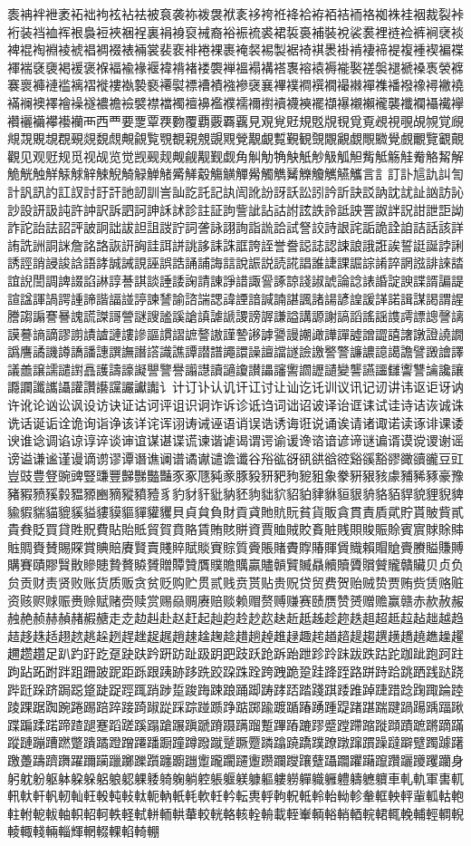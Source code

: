 袠袡袢袣袤袥袦袧袨袩袪被袬袭袮袯袰袱袲袳袴袵袶袷袸袹袺袻袼袽袾袿裀裁裂裃裄装裆裇裈裉裊裋裌裍裎裏裐裑裒裓裔裕裖裗裘裙裚裛補裝裞裟裠裡裢裣裤裥裦裧裨裩裪裫裬裭裮裯裰裱裲裳裴裵裶裷裸裹裺裻裼製裾裿褀褁褂褃褄褅褆複褈褉褊褋褌褍褎褏褐褑褒褓褔褕褖褗褘褙褚褛褜褝褞褟褠褡褢褣褤褥褦褧褨褩褪褫褬褭褮褯褰褱褲褳褴褵褶褷褸褹褺褻褼褽褾褿襀襁襂襃襄襅襆襇襈襉襊襋襌襍襎襏襐襑襒襓襔襕襖襗襘襙襚襛襜襝襞襟襠襡襢襣襤襥襦襧襨襩襪襫襬襭襮襯襰襱襲襳襴襵襶襷襸襹襺襻襼襽襾西覀要覂覃覄覅覆覇覈覉覊見覌覍覎規覐覑覒覓覔覕視覗覘覙覚覛覜覝覞覟覠覡覢覣覤覥覦覧覨覩親覫覬覭覮覯覰覱覲観覴覵覶覷覸覹覺覻覼覽覾覿觀见观觃规觅视觇览觉觊觋觌觍觎觏觐觑角觓觔觕觖觗觘觙觚觛觜觝觞觟觠觡觢解觤觥触觧觨觩觪觫觬觭觮觯觰觱觲觳觴觵觶觷觸觹觺觻觼觽觾觿言訁訂訃訄訅訆訇計訉訊訋訌訍討訏訐訑訒訓訔訕訖託記訙訚訛訜訝訞訟訠訡訢訣訤訥訦訧訨訩訪訫訬設訮訯訰許訲訳訴訵訶訷訸訹診註証訽訾訿詀詁詂詃詄詅詆詇詈詉詊詋詌詍詎詏詐詑詒詓詔評詖詗詘詙詚詛詜詝詞詟詠詡詢詣詤詥試詧詨詩詪詫詬詭詮詯詰話該詳詴詵詶詷詸詹詺詻詼詽詾詿誀誁誂誃誄誅誆誇誈誉誊誋誌認誎誏誐誑誒誓誔誕誖誗誘誙誚誛誜誝語誟誠誡誢誣誤誥誦誧誨誩說誫説読誮誯誰誱課誳誴誵誶誷誸誹誺誻誼誽誾調諀諁諂諃諄諅諆談諈諉諊請諌諍諎諏諐諑諒諓諔諕論諗諘諙諚諛諜諝諞諟諠諡諢諣諤諥諦諧諨諩諪諫諬諭諮諯諰諱諲諳諴諵諶諷諸諹諺諻諼諽諾諿謀謁謂謃謄謅謆謇謈謉謊謋謌謍謎謏謐謑謒謓謔謕謖謗謘謙謚講謜謝謞謟謠謡謢謣謤謥謦謧謨謩謪謫謬謭謮謯謰謱謲謳謴謵謶謷謸謹謺謻謼謽謾謿譀譁譂譃譄譅譆譇譈證譊譋譌譍譎譏譐譑譒譓譔譕譖譗識譙譚譛譜譝譞譟譠譡譢譣譤譥警譧譨譩譪譫譬譭譮譯議譱譲譳譴譵譶護譸譹譺譻譼譽譾譿讀讁讂讃讄讅讆讇讈讉變讋讌讍讎讏讐讑讒讓讔讕讖讗讘讙讚讛讜讝讞讟讠计订讣认讥讦讧讨让讪讫讬训议讯记讱讲讳讴讵讶讷许讹论讻讼讽设访诀证诂诃评诅识诇诈诉诊诋诌词诎诏诐译诒诓诔试诖诗诘诙诚诛诜话诞诟诠诡询诣诤该详诧诨诩诪诫诬语诮误诰诱诲诳说诵诶请诸诹诺读诼诽课诿谀谁谂调谄谅谆谇谈谉谊谋谌谍谎谏谐谑谒谓谔谕谖谗谘谙谚谛谜谝谞谟谠谡谢谣谤谥谦谧谨谩谪谫谬谭谮谯谰谱谲谳谴谵谶谷谸谹谺谻谼谽谾谿豀豁豂豃豄豅豆豇豈豉豊豋豌豍豎豏豐豑豒豓豔豕豖豗豘豙豚豛豜豝豞豟豠象豢豣豤豥豦豧豨豩豪豫豬豭豮豯豰豱豲豳豴豵豶豷豸豹豺豻豼豽豾豿貀貁貂貃貄貅貆貇貈貉貊貋貌貍貎貏貐貑貒貓貔貕貖貗貘貙貚貛貜貝貞貟負財貢貣貤貥貦貧貨販貪貫責貭貮貯貰貱貲貳貴貵貶買貸貹貺費貼貽貾貿賀賁賂賃賄賅賆資賈賉賊賋賌賍賎賏賐賑賒賓賔賕賖賗賘賙賚賛賜賝賞賟賠賡賢賣賤賥賦賧賨賩質賫賬賭賮賯賰賱賲賳賴賵賶賷賸賹賺賻購賽賾賿贀贁贂贃贄贅贆贇贈贉贊贋贌贍贎贏贐贑贒贓贔贕贖贗贘贙贚贛贜贝贞负贠贡财责贤败账货质贩贪贫贬购贮贯贰贱贲贳贴贵贶贷贸费贺贻贼贽贾贿赀赁赂赃资赅赆赇赈赉赊赋赌赍赎赏赐赑赒赓赔赕赖赗赘赙赚赛赜赝赞赟赠赡赢赣赤赥赦赧赨赩赪赫赬赭赮赯走赱赲赳赴赵赶起赸赹赺赻赼赽赾赿趀趁趂趃趄超趆趇趈趉越趋趌趍趎趏趐趑趒趓趔趕趖趗趘趙趚趛趜趝趞趟趠趡趢趣趤趥趦趧趨趩趪趫趬趭趮趯趰趱趲足趴趵趶趷趸趹趺趻趼趽趾趿跀跁跂跃跄跅跆跇跈跉跊跋跌跍跎跏跐跑跒跓跔跕跖跗跘跙跚跛跜距跞跟跠跡跢跣跤跥跦跧跨跩跪跫跬跭跮路跰跱跲跳跴践跶跷跸跹跺跻跼跽跾跿踀踁踂踃踄踅踆踇踈踉踊踋踌踍踎踏踐踑踒踓踔踕踖踗踘踙踚踛踜踝踞踟踠踡踢踣踤踥踦踧踨踩踪踫踬踭踮踯踰踱踲踳踴踵踶踷踸踹踺踻踼踽踾踿蹀蹁蹂蹃蹄蹅蹆蹇蹈蹉蹊蹋蹌蹍蹎蹏蹐蹑蹒蹓蹔蹕蹖蹗蹘蹙蹚蹛蹜蹝蹞蹟蹠蹡蹢蹣蹤蹥蹦蹧蹨蹩蹪蹫蹬蹭蹮蹯蹰蹱蹲蹳蹴蹵蹶蹷蹸蹹蹺蹻蹼蹽蹾蹿躀躁躂躃躄躅躆躇躈躉躊躋躌躍躎躏躐躑躒躓躔躕躖躗躘躙躚躛躜躝躞躟躠躡躢躣躤躥躦躧躨躩躪身躬躭躮躯躰躱躲躳躴躵躶躷躸躹躺躻躼躽躾躿軀軁軂軃軄軅軆軇軈軉車軋軌軍軎軏軐軑軒軓軔軕軖軗軘軙軚軛軜軝軞軟軠軡転軣軤軥軦軧軨軩軪軫軬軭軮軯軰軱軲軳軴軵軶軷軸軹軺軻軼軽軾軿輀輁輂較輄輅輆輇輈載輊輋輌輍輎輏輐輑輒輓輔輕輖輗輘輙輚輛輜輝輞輟輠輡輢輣